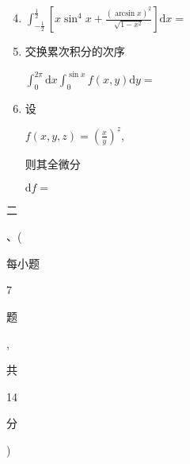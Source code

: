 \documentclass[10pt]{article}
\begin{document}
\begin{enumerate}
  \setcounter{enumi}{3}
  \item $\int_{-\frac{1}{2}}^{\frac{1}{2}}\left[x \sin ^{4} x+\frac{(\arcsin x)^{2}}{\sqrt{1-x^{2}}}\right] \mathrm{d} x=$

  \item \begin{CJK}{UTF8}{mj}交换累次积分的次序\end{CJK} $\int_{0}^{2 \pi} \mathrm{d} x \int_{0}^{\sin x} f(x, y) \mathrm{d} y=$

  \item \begin{CJK}{UTF8}{mj}设\end{CJK} $f(x, y, z)=\left(\frac{x}{y}\right)^{z}$, \begin{CJK}{UTF8}{mj}则其全微分\end{CJK} $\mathrm{d} f=$

\end{enumerate}
\begin{CJK}{UTF8}{mj}二\end{CJK}、(\begin{CJK}{UTF8}{mj}每小题\end{CJK} 7 \begin{CJK}{UTF8}{mj}题\end{CJK}, \begin{CJK}{UTF8}{mj}共\end{CJK} 14 \begin{CJK}{UTF8}{mj}分\end{CJK})
\end{document}
